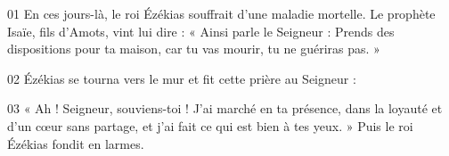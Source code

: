 01 En ces jours-là, le roi Ézékias souffrait d’une maladie mortelle. Le prophète Isaïe, fils d’Amots, vint lui dire : « Ainsi parle le Seigneur : Prends des dispositions pour ta maison, car tu vas mourir, tu ne guériras pas. »

02 Ézékias se tourna vers le mur et fit cette prière au Seigneur :

03 « Ah ! Seigneur, souviens-toi ! J’ai marché en ta présence, dans la loyauté et d’un cœur sans partage, et j’ai fait ce qui est bien à tes yeux. » Puis le roi Ézékias fondit en larmes.
